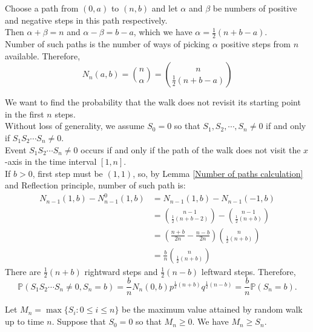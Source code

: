 \documentclass{huhtakm-template-book}
\newcommand{\prob}{\mathbb{P}}
\begin{document}
\begin{proofing}
	Choose a path from $(0,a)$ to $(n,b)$ and let $\alpha$ and $\beta$ be numbers of positive and negative steps in this path respectively.\\
	Then $\alpha+\beta=n$ and $\alpha-\beta=b-a$, which we have $\alpha=\frac{1}{2}(n+b-a)$.\\
	Number of such paths is the number of ways of picking $\alpha$ positive steps from $n$ available. Therefore,
	\begin{equation*}
		N_{n}(a,b)=\binom{n}{\alpha}=\binom{n}{\frac{1}{2}(n+b-a)}
	\end{equation*}
\end{proofing}
\begin{eg}
	We want to find the probability that the walk does not revisit its starting point in the first $n$ steps.\\
	Without loss of generality, we assume $S_{0}=0$ so that $S_{1},S_{2},\cdots,S_{n}\neq 0$ if and only if $S_{1}S_{2}\cdots S_{n}\neq 0$.\\
	Event $S_{1}S_{2}\cdots S_{n}\neq 0$ occurs if and only if the path of the walk does not visit the $x$-axis in the time interval $[1,n]$.\\
	If $b>0$, first step must be $(1,1)$, so, by Lemma \ref{Number of paths calculation} and Reflection principle, number of such path is:
	\begin{align*}
		N_{n-1}(1,b)-N_{n-1}^{0}(1,b)&=N_{n-1}(1,b)-N_{n-1}(-1,b)\\
		&=\binom{n-1}{\frac{1}{2}(n+b-2)}-\binom{n-1}{\frac{1}{2}(n+b)}\\
		&=\left(\frac{n+b}{2n}-\frac{n-b}{2n}\right)\binom{n}{\frac{1}{2}(n+b)}\\
		&=\frac{b}{n}\binom{n}{\frac{1}{2}(n+b)}
	\end{align*}
	There are $\frac{1}{2}(n+b)$ rightward steps and $\frac{1}{2}(n-b)$ leftward steps. Therefore,
	\begin{equation*}
		\prob(S_{1}S_{2}\cdots S_{n}\neq 0,S_{n}=b)=\frac{b}{n}N_{n}(0,b)p^{\frac{1}{2}(n+b)}q^{\frac{1}{2}(n-b)}=\frac{b}{n}\prob(S_{n}=b).
	\end{equation*}
\end{eg}
\begin{eg}
	Let $M_{n}=\max\{S_{i}:0\leq i\leq n\}$ be the maximum value attained by random walk up to time $n$. Suppose that $S_{0}=0$ so that $M_{n}\geq 0$. We have $M_{n}\geq S_{n}$.
\end{eg}
\end{document}
